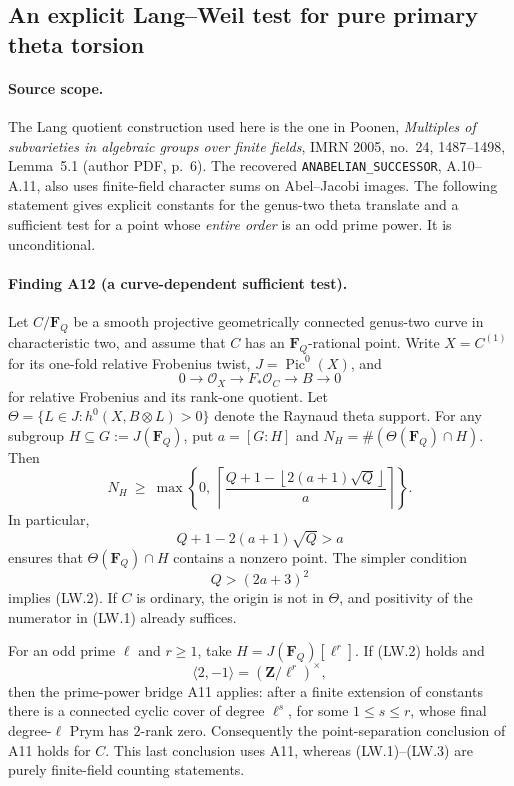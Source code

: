\subsection{An explicit Lang--Weil test for pure primary theta torsion}
\label{sec:lang-weil-theta}

\paragraph{Source scope.}
The Lang quotient construction used here is the one in Poonen,
\emph{Multiples of subvarieties in algebraic groups over finite fields},
IMRN 2005, no.~24, 1487--1498, Lemma~5.1 (author PDF, p.~6).
The recovered \texttt{ANABELIAN\_SUCCESSOR}, A.10--A.11, also uses
finite-field character sums on Abel--Jacobi images.  The following
statement gives explicit constants for the genus-two theta translate
and a sufficient test for a point whose \emph{entire order} is an odd
prime power.  It is unconditional.

\paragraph{Finding A12 (a curve-dependent sufficient test).}
Let $C/\mathbf F_Q$ be a smooth projective geometrically connected
genus-two curve in characteristic two, and assume that $C$ has an
$\mathbf F_Q$-rational point.  Write $X=C^{(1)}$ for its one-fold
relative Frobenius twist,
$J=\operatorname{Pic}^0(X)$, and
\[
 0\longrightarrow\mathcal O_X\longrightarrow F_*\mathcal O_C
 \longrightarrow B\longrightarrow0
\]
for relative Frobenius and its rank-one quotient.  Let
$\Theta=\{L\in J:h^0(X,B\otimes L)>0\}$ denote the Raynaud theta
support.  For any subgroup $H\subseteq G:=J(\mathbf F_Q)$, put
$a=[G:H]$ and
$N_H=\#(\Theta(\mathbf F_Q)\cap H)$.  Then
\[
 N_H\ \ge\
 \max\left\{0,\
 \left\lceil
 \frac{Q+1-\left\lfloor2(a+1)\sqrt Q\right\rfloor}{a}
 \right\rceil\right\}.
 \tag{LW.1}
\]
In particular,
\[
       Q+1-2(a+1)\sqrt Q>a
 \tag{LW.2}
\]
ensures that $\Theta(\mathbf F_Q)\cap H$ contains a nonzero point.
The simpler condition
\[
                       Q>(2a+3)^2
 \tag{LW.3}
\]
implies (LW.2).  If $C$ is ordinary, the origin is not in $\Theta$,
and positivity of the numerator in (LW.1) already suffices.

For an odd prime $\ell$ and $r\ge1$, take
$H=J(\mathbf F_Q)[\ell^r]$.  If (LW.2) holds and
\[
             \langle 2,-1\rangle=(\mathbf Z/\ell^r)^\times,
 \tag{LW.4}
\]
then the prime-power bridge A11 applies: after a finite extension of
constants there is a connected cyclic cover of degree $\ell^s$,
for some $1\le s\le r$, whose final degree-$\ell$ Prym has $2$-rank zero.
Consequently the point-separation conclusion of A11 holds for $C$.
This last conclusion uses A11, whereas (LW.1)--(LW.3) are purely
finite-field counting statements.

